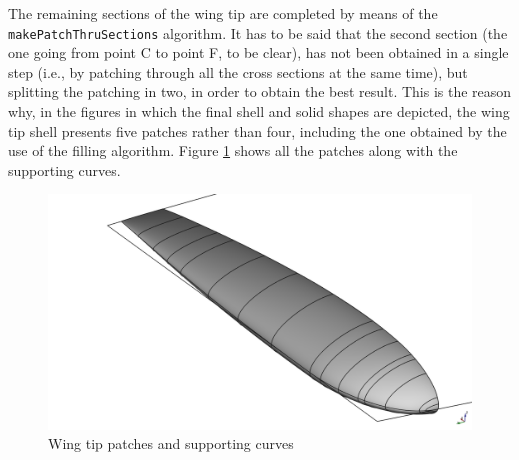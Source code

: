 \bigskip
\noindent
The remaining sections of the wing tip are completed by means of the \lstinline[language=Java]!makePatchThruSections! algorithm. It has to be said that the second section (the one going from point C to point F, to be clear), has not been obtained in a single step (i.e., by patching through all the cross sections at the same time), but splitting the patching in two, in order to obtain the best result. This is the reason why, in the figures in which the final shell and solid shapes are depicted, the wing tip shell presents five patches rather than four, including the one obtained by the use of the filling algorithm. Figure \ref{fig:WingTipFinal} shows all the patches along with the supporting curves.
% 
\begin{figure}[H]
\centering
\includegraphics[scale=0.38]{Immagini/Capitolo3/WingTipPatches}
\caption{Wing tip patches and supporting curves}
\label{fig:WingTipFinal}
\end{figure}
%  

